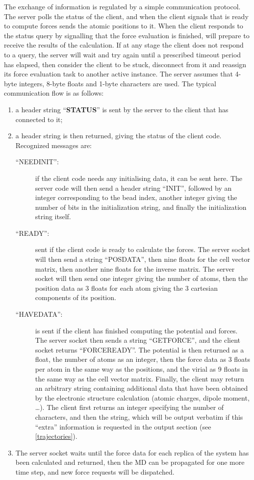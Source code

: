 \documentclass[11pt,english,fleqn]{report}
\begin{document}
The exchange of information is regulated by a simple 
communication protocol. The server polls the status of the client,
and when the client signals that is ready to compute forces 
\ipi sends the atomic positions to it. When the client responds to the
status query by signalling that the force evaluation is finished,
\ipi will prepare to receive the results of the calculation.
 If at any stage the client does not respond to a query, the server 
will wait and try again until a prescribed timeout period has elapsed, 
then consider the client to be stuck, disconnect from it 
and reassign its force evaluation task to another active instance. 
The server assumes that 4-byte integers, 8-byte floats
and 1-byte characters are used. The typical communication flow is
as follows:
%
\begin{enumerate}
\item a header string {}``\textbf{STATUS}'' is sent by the server to 
the client that has connected to it;
\item a header string is then returned, giving the status of the client
code. Recognized messages are:
\begin{description}
\item [{{}``NEEDINIT'':}] if the client code needs any initialising data,
it can be sent here. The server code will then send a header string
{}``INIT'', followed by an integer corresponding to the bead index,
another integer giving the number of bits in
the initialization string, and finally the initialization string itself.
\item [{{}``READY'':}] sent if the client code is ready to calculate
the forces. The server socket will then send a string {}``POSDATA'',
then nine floats for the cell vector matrix, then another nine floats
for the inverse matrix. The server socket will then send one
integer giving the number of atoms, then the position data as 3 floats
for each atom giving the 3 cartesian components of its position.
\item [{{}``HAVEDATA'':}] is sent if the client has finished computing the
potential and forces. The server socket then sends a string {}``GETFORCE'',
and the client socket returns {}``FORCEREADY''. The potential is
then returned as a float, the number of atoms as an integer, then
the force data as 3 floats per atom in the same way as the positions,
and the virial as 9 floats in the same way as the cell vector matrix. 
Finally, the client may return an arbitrary string containing additional
data that have been obtained by the electronic structure calculation 
(atomic charges, dipole moment, \ldots). The client first returns
an integer specifying the number of characters, and then the string,
which will be output verbatim if this ``extra'' information is
requested in the output section (see \ref{trajectories}).

\end{description}
\item The server socket waits until the force data for each replica of the
system has been calculated and returned, then the MD can be propagated for
one more time step, and new force requests will be dispatched.
\end{enumerate}
\end{document}
